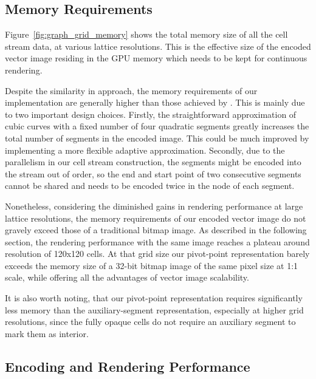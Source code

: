 \documentclass[11pt,a4paper,twoside]{article}
\begin{document}
\subsection {Memory Requirements}

Figure~\ref{fig:graph_grid_memory} shows the total memory size of all the cell stream data, at various lattice resolutions. This is the effective size of the encoded vector image residing in the GPU memory which needs to be kept for continuous rendering.

Despite the similarity in approach, the memory requirements of our implementation are generally higher than those achieved by \cite{NehabHoppe08}. This is mainly due to two important design choices. Firstly, the straightforward approximation of cubic curves with a fixed number of four quadratic segments greatly increases the total number of segments in the encoded image. This could be much improved by implementing a more flexible adaptive approximation. Secondly, due to the parallelism in our cell stream construction, the segments might be encoded into the stream out of order, so the end and start point of two consecutive segments cannot be shared and needs to be encoded twice in the node of each segment.

Nonetheless, considering the diminished gains in rendering performance at large lattice resolutions, the memory requirements of our encoded vector image do not gravely exceed those of a traditional bitmap image. As described in the following section, the rendering performance with the same image reaches a plateau around resolution of 120x120 cells. At that grid size our pivot-point representation barely exceeds the memory size of a 32-bit bitmap image of the same pixel size at 1:1 scale, while offering all the advantages of vector image scalability.

It is also worth noting, that our pivot-point representation requires significantly less memory than the auxiliary-segment representation, especially at higher grid resolutions, since the fully opaque cells do not require an auxiliary segment to mark them as interior.

\subsection {Encoding and Rendering Performance}
\end{document}
